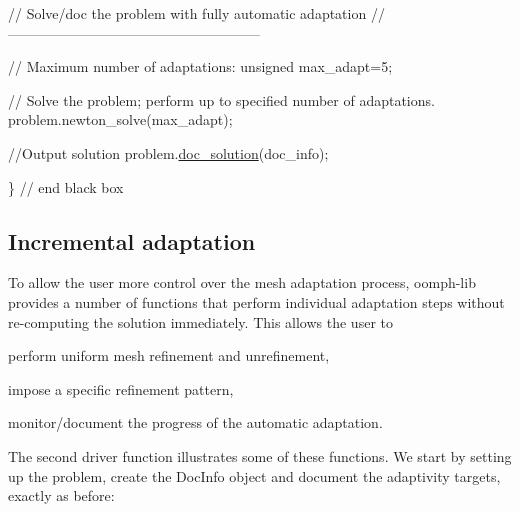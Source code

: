  
\begin{DoxyCodeInclude}
  \textcolor{comment}{// Solve/doc the problem with fully automatic adaptation}
  \textcolor{comment}{//------------------------------------------------------}

  \textcolor{comment}{// Maximum number of adaptations:}
  \textcolor{keywordtype}{unsigned} max\_adapt=5;

  \textcolor{comment}{// Solve the problem; perform up to specified number of adaptations.}
  problem.newton\_solve(max\_adapt);
  
  \textcolor{comment}{//Output solution}
  problem.\hyperlink{classRefineableFishPoissonProblem_aeee1bf23216971b50b8822c45e62c48b}{doc\_solution}(doc\_info);   

\} \textcolor{comment}{// end black box}

\end{DoxyCodeInclude}




\hypertarget{index_incremental}{}\subsection{Incremental adaptation}\label{index_incremental}
To allow the user more control over the mesh adaptation process, {\ttfamily oomph-\/lib} provides a number of functions that perform individual adaptation steps without re-\/computing the solution immediately. This allows the user to
\begin{DoxyItemize}
\item perform uniform mesh refinement and unrefinement,
\item impose a specific refinement pattern,
\item monitor/document the progress of the automatic adaptation.
\end{DoxyItemize}The second driver function illustrates some of these functions. We start by setting up the problem, create the {\ttfamily Doc\+Info} object and document the adaptivity targets, exactly as before\+:

